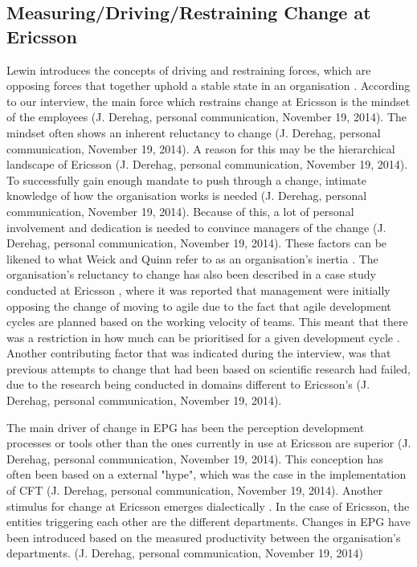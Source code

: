 \documentclass[final_report_innit.tex]{subfiles}
\begin{document}
\subsection*{Measuring/Driving/Restraining Change at Ericsson}
Lewin introduces the concepts of driving and restraining forces, which are opposing forces that together uphold a stable state in an organisation \cite{burnes2004kurt}. According to our interview, the main force which restrains change at Ericsson is the mindset of the employees (J. Derehag, personal communication, November 19, 2014). The mindset often shows an inherent reluctancy to change (J. Derehag, personal communication, November 19, 2014). A reason for this may be the hierarchical landscape of Ericsson (J. Derehag, personal communication, November 19, 2014). To successfully gain enough mandate to push through a change, intimate knowledge of how the organisation works is needed (J. Derehag, personal communication, November 19, 2014). Because of this, a lot of personal involvement and dedication is needed to convince managers of the change (J. Derehag, personal communication, November 19, 2014). These factors can be likened to what Weick and Quinn refer to as an organisation's inertia \cite{weick1999organizational}. The organisation's reluctancy to change has also been described in a case study conducted at Ericsson \cite{karlstrom2005combining}, where it was reported that management were initially opposing the change of moving to agile due to the fact that agile development cycles are planned based on the working velocity of teams. This meant that there was a restriction in how much can be prioritised for a given development cycle \cite{karlstrom2005combining}. Another contributing factor that was indicated during the interview, was that previous attempts to change that had been based on scientific research had failed, due to the research being conducted in domains different to Ericsson's (J. Derehag, personal communication, November 19, 2014). 

The main driver of change in EPG has been the perception development processes or tools other than the ones currently in use at Ericsson are superior (J. Derehag, personal communication, November 19, 2014). This conception has often been based on a external "hype", which was the case in the implementation of CFT (J. Derehag, personal communication, November 19, 2014). Another stimulus for change at Ericsson emerges dialectically \cite{van1995explaining}. In the case of Ericsson, the entities triggering each other are the different departments. Changes in EPG have been introduced based on the measured productivity between the organisation's departments. (J. Derehag, personal communication, November 19, 2014)
\end{document}
